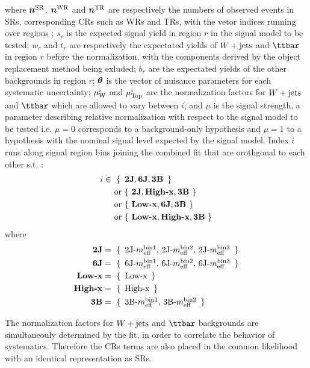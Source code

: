where 
$\bm{n}^{\mathrm{SR}}$, $\bm{n}^{\mathrm{WR}}$ and $\bm{n}^{\mathrm{TR}}$ are respectively the numbers of observed events in SRs, corresponding CRs such as WRs and TRs, with the vetor indices running over regions ;
$s_{r}$ is the expected signal yield in region $r$ in the signal model to be tested;
$w_{r}$ and $t_{r}$ are respectively the expectated yields of $W+\mathrm{jets}$ and $\ttbar$ in region $r$ before the normalization, with the components derived by the object replacement method being exluded;
$b_{r}$ are the expectated yields of the other backgrounds in region $r$;
$\bm{\theta}$ is the vector of nuisance parameters for each systematic uncertainty; 
$\mu_{\mathrm{W}}^i$ and $\mu_{\mathrm{Top}}^i$ are the normalization factors for $W+\mathrm{jets}$ and $\ttbar$ which are allowed to vary between $i$; 
and $\mu$ is the signal strength, a parameter describing relative normalization with respect to the signal model to be tested i.e. $\mu=0$ corresponds to a background-only hypothesis and $\mu=1$ to a hypothesis with the nominal signal level expected by the signal model. Index $i$ runs along signal region bins joining the combined fit that are orothgonal to each other s.t. :
%
\begin{align}
i \in \,\, \{ \,\,\, & \textbf{2J},\textbf{6J},\textbf{3B}  \,\,\, \}  \nonumber \\
\mbox{ or } & \{ \,\, \textbf{2J},\textbf{High-x},\textbf{3B} \,\,\}  \nonumber \\
\mbox{ or } & \{ \,\, \textbf{Low-x},\textbf{6J},\textbf{3B} \,\,\}  \nonumber \\
\mbox{ or } & \{ \,\, \textbf{Low-x},\textbf{High-x},\textbf{3B} \,\,\}
\end{align}
where
\begin{align}
\textbf{2J} & = \,\, \{ \,\,\, \mbox{2J-$m_{\mathrm{eff}}^{\mathrm{bin 1}}$, 2J-$m_{\mathrm{eff}}^{\mathrm{bin 2}}$, 2J-$m_{\mathrm{eff}}^{\mathrm{bin 3}}$}  \,\,\, \}  \nonumber \\
\textbf{6J} & = \,\, \{ \,\,\, \mbox{6J-$m_{\mathrm{eff}}^{\mathrm{bin 1}}$, 6J-$m_{\mathrm{eff}}^{\mathrm{bin 2}}$, 6J-$m_{\mathrm{eff}}^{\mathrm{bin 3}}$}  \,\,\, \}  \nonumber \\
\textbf{Low-x} & = \,\, \{ \,\,\, \mbox{Low-x}  \,\,\, \}  \nonumber \\
\textbf{High-x} & = \,\, \{ \,\,\,\mbox{High-x}   \,\,\, \}  \nonumber \\
\textbf{3B} & = \,\, \{ \,\,\, \mbox{3B-$m_{\mathrm{eff}}^{\mathrm{bin 1}}$, 3B-$m_{\mathrm{eff}}^{\mathrm{bin 2}}$}  \,\,\, \}  \nonumber \\
\end{align}

The normalization factors for $W+\mathrm{jets}$ and $\ttbar$ backgrounds are simultaneouly determined by the fit,
in order to correlate the behavior of systematics.
Therefore the CRs terms are also placed in the common likelihood with an identical representation as SRs. \\

